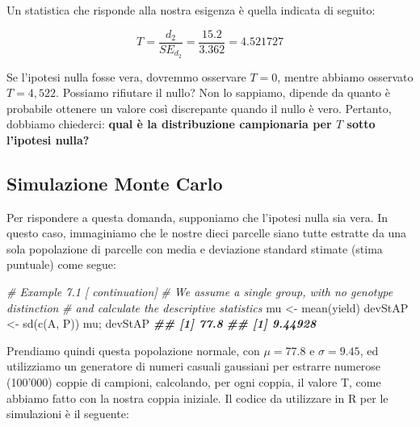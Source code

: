 \documentclass[
  12pt,
]{book}
\newenvironment{Shaded}{\begin{snugshade}}{\end{snugshade}}
\newcommand{\CommentTok}[1]{\textcolor[rgb]{0.56,0.35,0.01}{\textit{#1}}}
\newcommand{\DocumentationTok}[1]{\textcolor[rgb]{0.56,0.35,0.01}{\textbf{\textit{#1}}}}
\newcommand{\FunctionTok}[1]{\textcolor[rgb]{0.00,0.00,0.00}{#1}}
\newcommand{\NormalTok}[1]{#1}
\newcommand{\OtherTok}[1]{\textcolor[rgb]{0.56,0.35,0.01}{#1}}
\begin{document}
Un statistica che risponde alla nostra esigenza è quella indicata di seguito:

\[T = \frac{d_2}{SE_{d_2}} = \frac{15.2}{3.362} = 4.521727\]

Se l'ipotesi nulla fosse vera, dovremmo osservare \(T = 0\), mentre abbiamo osservato \(T = 4,522\). Possiamo rifiutare il nullo? Non lo sappiamo, dipende da quanto è probabile ottenere un valore così discrepante quando il nullo è vero. Pertanto, dobbiamo chiederci: \textbf{qual è la distribuzione campionaria per \(T\) sotto l'ipotesi nulla?}

\hypertarget{simulazione-monte-carlo}{%
\subsection{Simulazione Monte Carlo}\label{simulazione-monte-carlo}}

Per rispondere a questa domanda, supponiamo che l'ipotesi nulla sia vera. In questo caso, immaginiamo che le nostre dieci parcelle siano tutte estratte da una sola popolazione di parcelle con media e deviazione standard stimate (stima puntuale) come segue:

\begin{Shaded}
\begin{Highlighting}[]
\CommentTok{\# Example 7.1 [ continuation]}
\CommentTok{\# We assume a single group, with no genotype distinction}
\CommentTok{\# and calculate the descriptive statistics}
\NormalTok{mu }\OtherTok{\textless{}{-}} \FunctionTok{mean}\NormalTok{(yield)}
\NormalTok{devStAP }\OtherTok{\textless{}{-}} \FunctionTok{sd}\NormalTok{(}\FunctionTok{c}\NormalTok{(A, P))}
\NormalTok{mu; devStAP}
\DocumentationTok{\#\# [1] 77.8}
\DocumentationTok{\#\# [1] 9.44928}
\end{Highlighting}
\end{Shaded}

Prendiamo quindi questa popolazione normale, con \(\mu = 77.8\) e \(\sigma = 9.45\), ed utilizziamo un generatore di numeri casuali gaussiani per estrarre numerose (100'000) coppie di campioni, calcolando, per ogni coppia, il valore T, come abbiamo fatto con la nostra coppia iniziale. Il codice da utilizzare in R per le simulazioni è il seguente:
\end{document}
